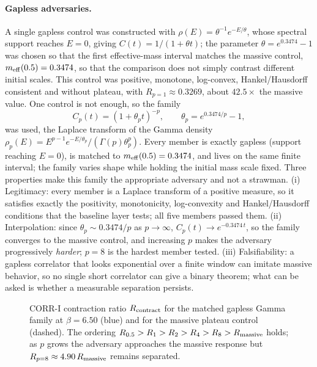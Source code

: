 \documentclass[11pt,a4paper]{article}
\theoremstyle{definition}
\theoremstyle{remark}
\begin{document}
\paragraph{Gapless adversaries.} A single gapless control was constructed with $\rho(E)=\theta^{-1}e^{-E/\theta}$, whose spectral support reaches $E=0$, giving $C(t)=1/(1+\theta t)$; the parameter $\theta=e^{0.3474}-1$ was chosen so that the first effective-mass interval matches the massive control, $m_{\rm eff}(0.5)=0.3474$, so that the comparison does not simply contrast different initial scales. This control was positive, monotone, log-convex, Hankel/Hausdorff consistent and without plateau, with $R_{p=1}\approx0.3269$, about $42.5\times$ the massive value. One control is not enough, so the family
\begin{equation}
C_p(t)=(1+\theta_p t)^{-p},\qquad \theta_p=e^{0.3474/p}-1,
\end{equation}
was used, the Laplace transform of the Gamma density $\rho_p(E)=E^{p-1}e^{-E/\theta_p}/(\Gamma(p)\theta_p^{p})$. Every member is exactly gapless (support reaching $E=0$), is matched to $m_{\rm eff}(0.5)=0.3474$, and lives on the same finite interval; the family varies shape while holding the initial mass scale fixed. Three properties make this family the appropriate adversary and not a strawman. (i) Legitimacy: every member is a Laplace transform of a positive measure, so it satisfies exactly the positivity, monotonicity, log-convexity and Hankel/Hausdorff conditions that the baseline layer tests; all five members passed them. (ii) Interpolation: since $\theta_p\sim 0.3474/p$ as $p\to\infty$, $C_p(t)\to e^{-0.3474\,t}$, so the family converges to the massive control, and increasing $p$ makes the adversary progressively \emph{harder}; $p=8$ is the hardest member tested. (iii) Falsifiability: a gapless correlator that looks exponential over a finite window can imitate massive behavior, so no single short correlator can give a binary theorem; what can be asked is whether a measurable separation persists.

\begin{figure}[t]
\centering
{}
\caption{CORR-I contraction ratio $R_{\rm contract}$ for the matched gapless Gamma family at $\beta=6.50$ (blue) and for the massive plateau control (dashed). The ordering $R_{0.5}>R_1>R_2>R_4>R_8>R_{\rm massive}$ holds; as $p$ grows the adversary approaches the massive response but $R_{p=8}\approx4.90\,R_{\rm massive}$ remains separated.}\label{fig:corr}
\end{figure}
\end{document}

